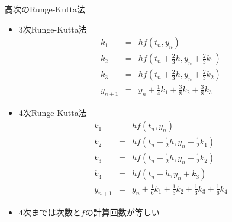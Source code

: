 \begin{frame}[t,fragile]{高次のRunge-Kutta法}
  \begin{itemize}
  \item 3次Runge-Kutta法
    \[
    \begin{array}{rcl}
      k_1 & = & h f(t_n, y_n) \\
      k_2 & = & h f(t_n + \frac{2}{3}h, y_n + \frac{2}{3}k_1) \\
      k_3 & = & h f(t_n + \frac{2}{3}h, y_n + \frac{2}{3}k_2) \\
      y_{n+1} & = & y_n + \frac{1}{4}k_1 + \frac{3}{8}k_2
      + \frac{3}{8}k_3
    \end{array}
    \]
  \item 4次Runge-Kutta法
    \[
    \begin{array}{rcl}
      k_1 & = & h f(t_n, y_n) \\
      k_2 & = & h f(t_n + \frac{1}{2}h, y_n + \frac{1}{2}k_1) \\
      k_3 & = & h f(t_n + \frac{1}{2}h, y_n + \frac{1}{2}k_2) \\
      k_4 & = & h f(t_n + h, y_n + k_3) \\
      y_{n+1} & = & y_n + \frac{1}{6}k_1 + \frac{1}{3}k_2
      + \frac{1}{3}k_3 + \frac{1}{6}k_4
    \end{array}
    \]
  \item 4次までは次数と$f$の計算回数が等しい
  \end{itemize}
\end{frame}

